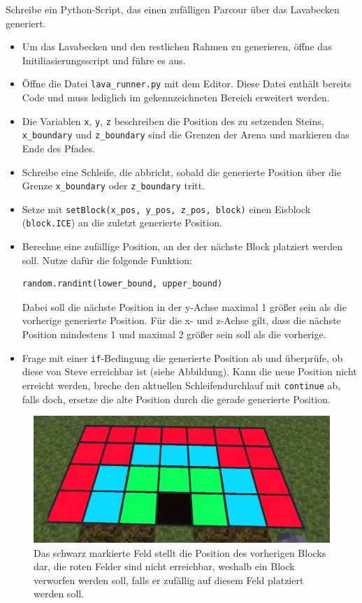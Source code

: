\large Schreibe ein Python-Script, das einen zufälligen Parcour über das Lavabecken generiert.
\begin{itemize}
	\item Um das Lavabecken und den restlichen Rahmen zu generieren, öffne das Initiliasierungsscript und führe es aus.
	
	\item Öffne die Datei \texttt{lava\_runner.py} mit dem Editor. Diese Datei enthält bereits Code und muss lediglich im gekennzeichneten Bereich erweitert werden.
	
	\item Die Variablen \texttt{x}, \texttt{y}, \texttt{z} beschreiben die Position des zu setzenden Steins, \texttt{x\_boundary} und \texttt{z\_boundary} sind die Grenzen der Arena und markieren das Ende des Pfades.
	
	\item Schreibe eine Schleife, die abbricht, sobald die generierte Position über die Grenze \texttt{x\_boundary} oder \texttt{z\_boundary} tritt.

	\item Setze mit \texttt{setBlock(x\_pos, y\_pos, z\_pos, block)}  einen Eisblock (\texttt{block.ICE}) an die zuletzt generierte Position.

	\item Berechne eine zufällige Position, an der der nächste Block platziert werden soll. Nutze dafür die folgende Funktion:
		\begin{lstlisting}[language=Python]
random.randint(lower_bound, upper_bound)
		\end{lstlisting}
	Dabei soll die nächste Position in der y-Achse maximal 1 größer sein als die vorherige generierte Position. Für die x- und z-Achse gilt, dass die nächste Position mindestens 1 und maximal 2 größer sein soll als die vorherige.
		
	\item Frage mit einer \texttt{if}-Bedingung die generierte Position ab und überprüfe, ob diese von Steve erreichbar ist (siehe Abbildung). Kann die neue Position nicht erreicht werden, breche den aktuellen Schleifendurchlauf mit \texttt{continue} ab, falls doch, ersetze die alte Position durch die gerade generierte Position.
\end{itemize}
\begin{figure}
\centering
\includegraphics[scale=0.25]{src/lava_runner/res/1layer.png}
\caption{Das schwarz markierte Feld stellt die Position des vorherigen Blocks dar, die roten Felder sind nicht erreichbar, weshalb ein Block verworfen werden soll, falls er zufällig auf diesem Feld platziert werden soll.}
\end{figure}
